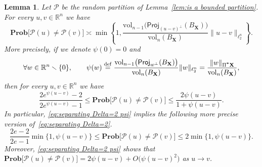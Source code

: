 \documentclass[11pt,reqno]{amsart}
\renewcommand{\le}{\leqslant}
\renewcommand{\setminus}{\smallsetminus}
\newcommand{\proj}{\mathsf{Proj}}
\newcommand{\X}{\mathbf X}
\newcommand{\R}{\mathbb R}
\newtheorem{lemma}[theorem]{Lemma}
\theoremstyle{remark}
\newcommand{\eqdef}{\stackrel{\mathrm{def}}{=}}
\renewcommand{\Pr}{\mathbf{Prob}}
\newcommand{\vol}{\mathrm{vol}}
\renewcommand{\1}{\mathbf 1}
\newcommand{\Part}{\mathscr{P}}
\begin{document}
\begin{lemma}\label{lem:separation psi} Let  $\Part$ be the random partition of Lemma~\ref{lem:is a bounded partition}. For every $u,v\in \R^n$  we have
\begin{equation}\label{eq:separating Delta=2} \Pr\big[\Part(u)\neq\Part(v)\big]\asymp\min\left\{1,\frac{\vol_{n-1}\big(\proj_{(u-v)^\perp}(B_{\X})\big)}{\vol_n(B_{\X})}\|u-v\|_{\ell_2^n}\right\}.
\end{equation}
More precisely, if we denote $\psi(0)=0$ and
\begin{equation}\label{eq:def psi}
\forall  w\in \R^n\setminus \{0\},\qquad \psi(w)\eqdef \frac{\vol_{n-1}\big(\proj_{w^\perp}(B_{\X})\big)}{\vol_n(B_{\X})}\|w\|_{\ell_2^n}=\frac{\|w\|_{\Pi^{\textbf *}\X}}{\vol_n(B_\X)},
\end{equation}
then for every $u,v\in \R^n$ we have
\begin{equation}\label{eq:separating Delta=2 psi}
\frac{2e^{\psi(u-v)}-2}{2e^{\psi(u-v)}-1}\le\Pr\big[\Part(u)\neq\Part(v)\big]\le \frac{2\psi(u-v)}{1+\psi(u-v)}.
\end{equation}
In particular, \eqref{eq:separating Delta=2 psi} implies the following more precise version of~\eqref{eq:separating Delta=2}.
$$
\frac{2e-2}{2e-1}\min\big\{1,\psi(u-v)\big\}\le \Pr\big[\Part(u)\neq\Part(v)\big]\le 2\min\big\{1,\psi(u-v)\big\}.$$
Moreover, \eqref{eq:separating Delta=2 psi} shows  that   $\Pr\big[\Part(u)\neq\Part(v)\big]=2\psi(u-v)+O\big(\psi(u-v)^2\big)$ as $u\to v $.
\end{lemma}
\end{document}
